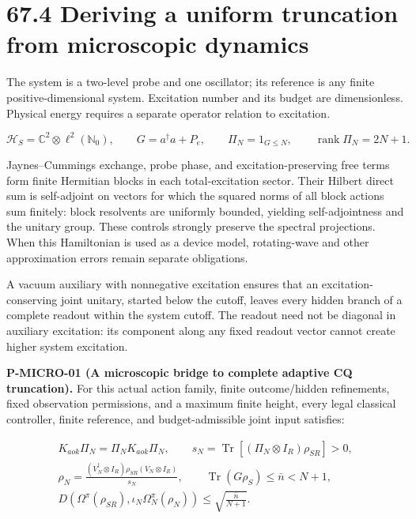 \documentclass[
  11pt,
  oneside]{book}
\begin{document}
\section{67.4 Deriving a uniform truncation from microscopic dynamics}

The system is a two-level probe and one oscillator; its reference is any
finite positive-dimensional system. Excitation number and its budget are
dimensionless. Physical energy requires a separate operator relation to
excitation.

\[
\mathcal H_S=\mathbb C^2\otimes\ell^2(\mathbb N_0),\qquad
G=a^\dagger a+P_e,\qquad
\Pi_N=1_{G\le N},\qquad \operatorname{rank}\Pi_N=2N+1.
\]

Jaynes--Cummings exchange, probe phase, and excitation-preserving free
terms form finite Hermitian blocks in each total-excitation sector.
Their Hilbert direct sum is self-adjoint on vectors for which the
squared norms of all block actions sum finitely: block resolvents are
uniformly bounded, yielding self-adjointness and the unitary group.
These controls strongly preserve the spectral projections. When this
Hamiltonian is used as a device model, rotating-wave and other
approximation errors remain separate obligations.

A vacuum auxiliary with nonnegative excitation ensures that an
excitation-conserving joint unitary, started below the cutoff, leaves
every hidden branch of a complete readout within the system cutoff. The
readout need not be diagonal in auxiliary excitation: its component
along any fixed readout vector cannot create higher system excitation.

\label{p-micro-01}{}

\textbf{P-MICRO-01 (A microscopic bridge to complete adaptive CQ
truncation).} For this actual action family, finite outcome/hidden
refinements, fixed observation permissions, and a maximum finite height,
every legal classical controller, finite reference, and
budget-admissible joint input satisfies:

\[
\begin{gathered}
K_{aok}\Pi_N=\Pi_NK_{aok}\Pi_N,\qquad
s_N=\operatorname{Tr}[(\Pi_N\otimes I_R)\rho_{SR}]>0,\\
\rho_N=\frac{(V_N^\dagger\otimes I_R)\rho_{SR}(V_N\otimes I_R)}{s_N},\qquad
\operatorname{Tr}(G\rho_S)\le\bar n<N+1,\\
D\!\left(\Omega^\pi(\rho_{SR}),\iota_N\Omega_N^\pi(\rho_N)\right)
\le\sqrt{\frac{\bar n}{N+1}}.
\end{gathered}
\]
\end{document}
